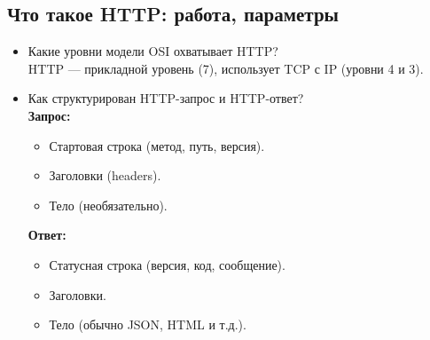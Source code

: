\documentclass[a4paper,14pt]{article}
\begin{document}
\subsection{Что такое HTTP: работа, параметры}

\begin{itemize}
\item Какие уровни модели OSI охватывает HTTP? \\
HTTP — прикладной уровень (7), использует TCP с IP (уровни 4 и 3).

\item Как структурирован HTTP-запрос и HTTP-ответ? \\
\textbf{Запрос:}
\begin{itemize}
  \item Стартовая строка (метод, путь, версия).
  \item Заголовки (headers).
  \item Тело (необязательно).
\end{itemize}

\textbf{Ответ:}
\begin{itemize}
  \item Статусная строка (версия, код, сообщение).
  \item Заголовки.
  \item Тело (обычно JSON, HTML и т.д.).
\end{itemize}
\end{itemize}
\end{document}
